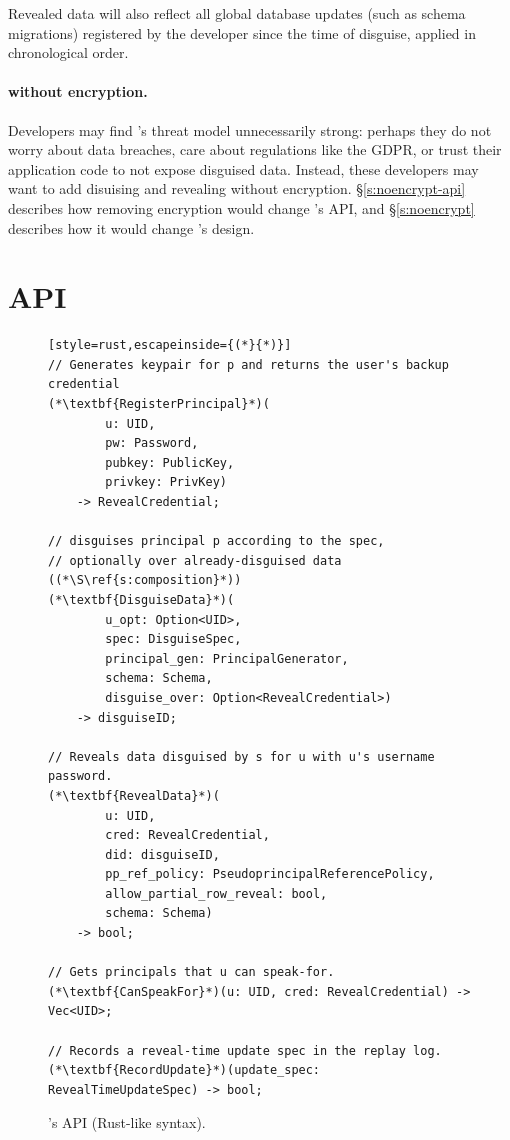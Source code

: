 Revealed data will also reflect all global database updates (such as schema
migrations) registered by the developer since the time of disguise, applied in
chronological order.


\paragraph{\sys without encryption.}
\label{s:semantics:noencrypt}

Developers may find \sys's threat model unnecessarily strong: perhaps they do
not worry about data breaches, care about regulations like the GDPR, or trust
their application code to not expose disguised data. Instead, these developers
may want to add disuising and revealing without encryption.
%
\S\ref{s:noencrypt-api} describes how removing encryption would change \sys's
API, and \S\ref{s:noencrypt} describes how it would change
\sys's design.


\section{API}
\label{s:api}

\begin{figure}[t]
\begin{lstlisting}[style=rust,escapeinside={(*}{*)}]
// Generates keypair for p and returns the user's backup credential
(*\textbf{RegisterPrincipal}*)(
        u: UID, 
        pw: Password,
        pubkey: PublicKey, 
        privkey: PrivKey)
    -> RevealCredential;

// disguises principal p according to the spec, 
// optionally over already-disguised data ((*\S\ref{s:composition}*))
(*\textbf{DisguiseData}*)(
        u_opt: Option<UID>, 
        spec: DisguiseSpec,
        principal_gen: PrincipalGenerator,
        schema: Schema,
        disguise_over: Option<RevealCredential>) 
    -> disguiseID;

// Reveals data disguised by s for u with u's username password. 
(*\textbf{RevealData}*)(
        u: UID, 
        cred: RevealCredential,
        did: disguiseID, 
        pp_ref_policy: PseudoprincipalReferencePolicy,
        allow_partial_row_reveal: bool,
        schema: Schema)
    -> bool;

// Gets principals that u can speak-for.
(*\textbf{CanSpeakFor}*)(u: UID, cred: RevealCredential) -> Vec<UID>;

// Records a reveal-time update spec in the replay log.
(*\textbf{RecordUpdate}*)(update_spec: RevealTimeUpdateSpec) -> bool;
\end{lstlisting}
\caption{\sys's API (Rust-like syntax).}
\label{f:api-high}
\end{figure}
%

